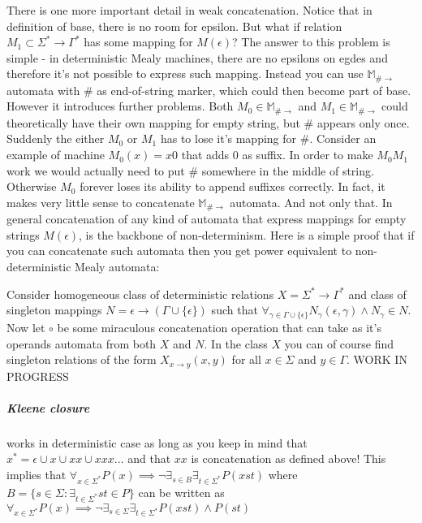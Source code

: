 \documentclass[12pt]{article}
\begin{document}
There is one more important detail in weak concatenation. Notice that in definition of base, there is no room for epsilon. But what if relation $M_1 \subset \Sigma^* \rightarrow \Gamma^*$ has some mapping for $M(\epsilon)$? The answer to this problem is simple - in deterministic Mealy machines, there are no epsilons on egdes and therefore it's not possible to express such mapping. Instead you can use $\mathbb{M}_{\#\rightarrow}$ automata with  $\#$ as end-of-string marker, which could then become part of base. However it introduces further problems. Both $M_0 \in \mathbb{M}_{\#\rightarrow}$ and $M_1 \in \mathbb{M}_{\#\rightarrow}$ could theoretically have their own mapping for empty string, but $\#$ appears only once. Suddenly the either $M_0$ or $M_1$ has to lose it's mapping for $\#$. Consider an example of machine $M_0(x)=x0$ that adds 0 as suffix. In order to make $M_0M_1$ work we would actually need to put $\#$ somewhere in the middle of string. Otherwise $M_0$ forever loses its ability to append suffixes correctly. In fact, it makes very little sense to concatenate $\mathbb{M}_{\#\rightarrow}$ automata. And not only that. In general concatenation of any kind of automata that express mappings for empty strings $M(\epsilon)$, is the backbone of non-determinism. Here is a simple proof that if you can concatenate such automata then you get power equivalent to non-deterministic Mealy automata:


Consider homogeneous class of deterministic relations $X = \Sigma^* \rightarrow \Gamma^*$ and class of singleton mappings $N = \epsilon \rightarrow (\Gamma\cup\{\epsilon\})$ such that $\forall_{\gamma\in\Gamma\cup\{\epsilon\}}N_\gamma(\epsilon,\gamma) \wedge N_\gamma  \in N$. Now let $\circ$ be some miraculous concatenation operation that can take as it's operands automata from both $X$ and $N$. In the class $X$ you can of course find singleton relations of the form $X_{x\rightarrow y}(x,y)$ for all $x\in \Sigma$ and $y \in \Gamma$. WORK IN PROGRESS



\subparagraph{Kleene closure}  works in deterministic case as long as you keep in mind that $x^* = \epsilon \cup x \cup xx \cup xxx ...$ and that $xx$ is concatenation as defined above! This implies that $\forall_{x\in \Sigma^*} P(x) \implies \neg \exists_{s\in B} \exists_{t\in\Sigma^*} P(xst)$ where $B = \{s\in\Sigma : \exists_{t\in\Sigma^*}st\in P\}$ can be written as  $\forall_{x\in \Sigma^*} P(x) \implies \neg \exists_{s\in \Sigma} \exists_{t\in\Sigma^*} P(xst) \wedge P(st)$ 
\end{document}
